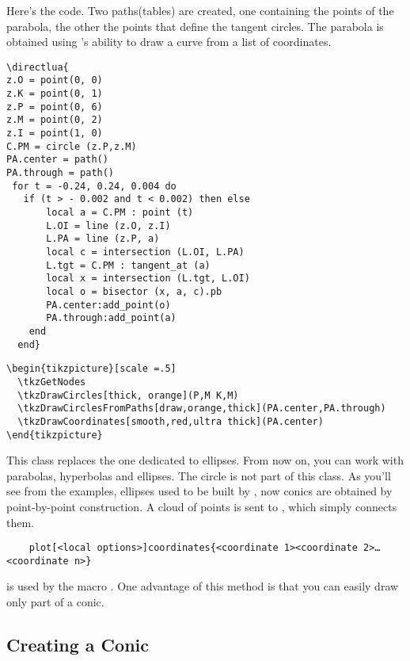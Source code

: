 Here's the code. Two paths(tables) are created, one containing the points of the parabola, the other the points that define the tangent circles.
The parabola is obtained using \TIKZ{}'s ability to draw a curve from a list of coordinates.

\begin{verbatim}
\directlua{
z.O = point(0, 0)
z.K = point(0, 1)
z.P = point(0, 6)
z.M = point(0, 2)
z.I = point(1, 0)
C.PM = circle (z.P,z.M)
PA.center = path()
PA.through = path()
 for t = -0.24, 0.24, 0.004 do
   if (t > - 0.002 and t < 0.002) then else
       local a = C.PM : point (t)
       L.OI = line (z.O, z.I)
       L.PA = line (z.P, a)
       local c = intersection (L.OI, L.PA)
       L.tgt = C.PM : tangent_at (a)
       local x = intersection (L.tgt, L.OI)
       local o = bisector (x, a, c).pb
       PA.center:add_point(o)
       PA.through:add_point(a)
    end
  end}
\end{verbatim}

\begin{verbatim}
\begin{tikzpicture}[scale =.5]
  \tkzGetNodes
  \tkzDrawCircles[thick, orange](P,M K,M)
  \tkzDrawCirclesFromPaths[draw,orange,thick](PA.center,PA.through)
  \tkzDrawCoordinates[smooth,red,ultra thick](PA.center)
\end{tikzpicture}
\end{verbatim}
This class replaces the one dedicated to ellipses. From now on, you can work with parabolas, hyperbolas and ellipses. The circle is not part of this class.
As you'll see from the examples, ellipses used to be built by \TIKZ{}, now conics are obtained by point-by-point construction. A cloud of points is sent to \TIKZ{}, which simply connects them.

\begin{mybox}
  \begin{verbatim}
    plot[<local options>]coordinates{<coordinate 1><coordinate 2>…<coordinate n>}
  \end{verbatim}
\end{mybox}

is used by the macro . One advantage of this method is that you can easily draw only part of a conic.


\subsection{Creating a Conic}
\label{sub:creating_a_conic}

